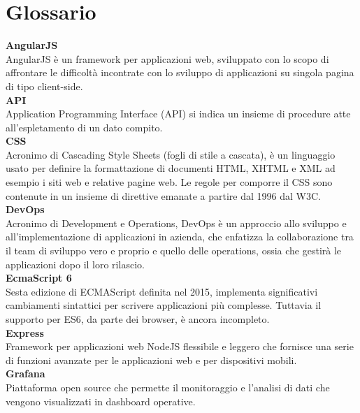 \section{Glossario}\label{glox}

\textbf{AngularJS}\-\\
AngularJS è un framework per applicazioni web, sviluppato con lo scopo di affrontare le difficoltà incontrate con lo sviluppo di applicazioni su singola pagina di tipo client-side.
\-\\

\textbf{API}\-\\
Application Programming Interface (API) si indica un insieme di procedure atte all'espletamento di un dato compito.
\-\\

\textbf{CSS}\-\\
Acronimo di Cascading Style Sheets (fogli di stile a cascata), è un linguaggio usato per definire la formattazione di documenti HTML, XHTML e XML ad esempio i siti web e relative pagine web. Le regole per comporre il CSS sono contenute in un insieme di direttive emanate a partire dal 1996 dal W3C. 
\-\\

\textbf{DevOps}\-\\
Acronimo di Development e Operations, DevOps è un approccio allo sviluppo e all'implementazione di applicazioni in azienda, che enfatizza la collaborazione tra il team di sviluppo vero e proprio e quello delle operations, ossia che gestirà le applicazioni dopo il loro rilascio.
\-\\

\textbf{EcmaScript 6}\-\\
Sesta edizione di ECMAScript definita nel 2015, implementa significativi cambiamenti sintattici per scrivere applicazioni più complesse. Tuttavia il supporto per ES6, da parte dei browser, è ancora incompleto.
\-\\

\textbf{Express}\-\\
Framework per applicazioni web NodeJS flessibile e leggero che fornisce una serie di funzioni 
avanzate per le applicazioni web e per dispositivi mobili. 
\-\\


\textbf{Grafana}\-\\
Piattaforma open source che permette il monitoraggio e l'analisi di dati che vengono visualizzati in dashboard operative.
\-\\

